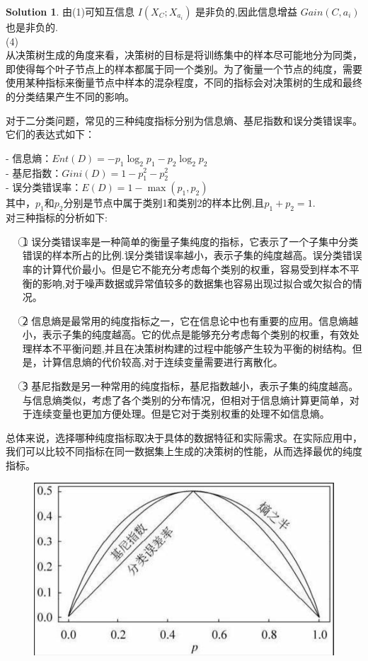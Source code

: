 \documentclass[a4paper,UTF8]{article}
\numberwithin{equation}{section}
\theoremstyle{definition}
\newtheorem*{solution}{Solution}
\begin{document}
\begin{solution}
由(1)可知互信息 $I(X_C; X_{a_i})$ 是非负的,因此信息增益 $Gain(C, a_i)$ 也是非负的.\\


(4)\\
从决策树生成的角度来看，决策树的目标是将训练集中的样本尽可能地分为同类，即使得每个叶子节点上的样本都属于同一个类别。为了衡量一个节点的纯度，需要使用某种指标来衡量节点中样本的混杂程度，不同的指标会对决策树的生成和最终的分类结果产生不同的影响。

对于二分类问题，常见的三种纯度指标分别为信息熵、基尼指数和误分类错误率。它们的表达式如下：


- 信息熵：$Ent(D) = -p_1 \log_2 p_1 - p_2 \log_2 p_2$\\
- 基尼指数：$Gini(D) = 1-p_1^2-p_2^2$\\
- 误分类错误率：$E(D) = 1-\max(p_1, p_2)$\\

其中，$p_1$和$p_2$分别是节点中属于类别1和类别2的样本比例,且$p_1 + p_2 =1$.\\ 


对三种指标的分析如下:
\begin{enumerate}
	\item[\textcircled{1}] 误分类错误率是一种简单的衡量子集纯度的指标，它表示了一个子集中分类错误的样本所占的比例.误分类错误率越小，表示子集的纯度越高。误分类错误率的计算代价最小。但是它不能充分考虑每个类别的权重，容易受到样本不平衡的影响,对于噪声数据或异常值较多的数据集也容易出现过拟合或欠拟合的情况。
	\item[\textcircled{2}] 信息熵是最常用的纯度指标之一，它在信息论中也有重要的应用。信息熵越小，表示子集的纯度越高。它的优点是能够充分考虑每个类别的权重，有效处理样本不平衡问题,并且在决策树构建的过程中能够产生较为平衡的树结构。但是，计算信息熵的代价较高,对于连续变量需要进行离散化。
	\item[\textcircled{3}] 基尼指数是另一种常用的纯度指标，基尼指数越小，表示子集的纯度越高。与信息熵类似，考虑了各个类别的分布情况，但相对于信息熵计算更简单，对于连续变量也更加方便处理。但是它对于类别权重的处理不如信息熵。
\end{enumerate}
总体来说，选择哪种纯度指标取决于具体的数据特征和实际需求。在实际应用中，我们可以比较不同指标在同一数据集上生成的决策树的性能，从而选择最优的纯度指标。

\begin{figure}[H] \centering  \includegraphics[scale=0.5]{3.png} \end{figure}
\end{solution}
\end{document}
